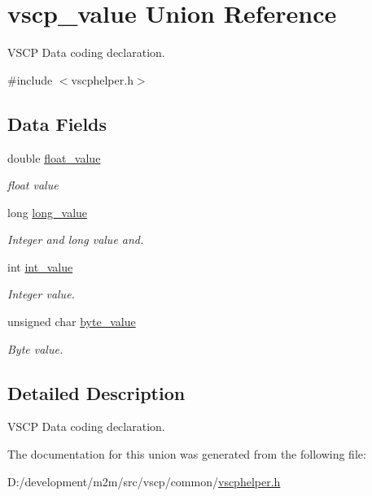 \hypertarget{unionvscp__value}{
\section{vscp\_\-value Union Reference}
\label{d1/dd2/unionvscp__value}
}


VSCP Data coding declaration.  




{\ttfamily \#include $<$vscphelper.h$>$}

\subsection*{Data Fields}
\begin{DoxyCompactItemize}
\item 
\hypertarget{unionvscp__value_a8c3f6e1986251c9d362adf660eb98816}{
double \hyperlink{unionvscp__value_a8c3f6e1986251c9d362adf660eb98816}{float\_\-value}}
\label{d1/dd2/unionvscp__value_a8c3f6e1986251c9d362adf660eb98816}

\begin{DoxyCompactList}\small\item\em float value \end{DoxyCompactList}\item 
\hypertarget{unionvscp__value_a297b7172a3a7646091f453172d80b09e}{
long \hyperlink{unionvscp__value_a297b7172a3a7646091f453172d80b09e}{long\_\-value}}
\label{d1/dd2/unionvscp__value_a297b7172a3a7646091f453172d80b09e}

\begin{DoxyCompactList}\small\item\em Integer and long value and. \end{DoxyCompactList}\item 
\hypertarget{unionvscp__value_a073a059d62ed1a83d90d328aec3099ca}{
int \hyperlink{unionvscp__value_a073a059d62ed1a83d90d328aec3099ca}{int\_\-value}}
\label{d1/dd2/unionvscp__value_a073a059d62ed1a83d90d328aec3099ca}

\begin{DoxyCompactList}\small\item\em Integer value. \end{DoxyCompactList}\item 
\hypertarget{unionvscp__value_a0d4686f9816088014ad759b75cf5e87e}{
unsigned char \hyperlink{unionvscp__value_a0d4686f9816088014ad759b75cf5e87e}{byte\_\-value}}
\label{d1/dd2/unionvscp__value_a0d4686f9816088014ad759b75cf5e87e}

\begin{DoxyCompactList}\small\item\em Byte value. \end{DoxyCompactList}\end{DoxyCompactItemize}


\subsection{Detailed Description}
VSCP Data coding declaration. 

The documentation for this union was generated from the following file:\begin{DoxyCompactItemize}
\item 
D:/development/m2m/src/vscp/common/\hyperlink{vscphelper_8h}{vscphelper.h}\end{DoxyCompactItemize}
